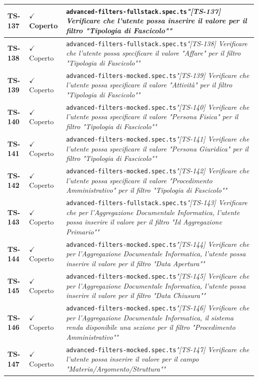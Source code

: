 \documentclass[a4paper,12pt]{article}
\newcommand{\ok}{\textcolor{green!60!black}{$\checkmark$ Coperto}}
\newcommand{\f}[1]{\nolinkurl{#1}\newline}
\newcommand{\q}[1]{\textit{#1}}
\begin{document}
\begin{longtable}{|p{1.5cm}|p{3.0cm}|p{10.5cm}|}
\textbf{TS-137} & \ok & \f{advanced-filters-fullstack.spec.ts}\q{"[TS-137] Verificare che l'utente possa inserire il valore per il filtro "Tipologia di Fascicolo""} \\ \hline
\textbf{TS-138} & \ok & \f{advanced-filters-fullstack.spec.ts}\q{"[TS-138] Verificare che l'utente possa specificare il valore "Affare" per il filtro "Tipologia di Fascicolo""} \\ \hline
\textbf{TS-139} & \ok & \f{advanced-filters-mocked.spec.ts}\q{"[TS-139] Verificare che l'utente possa specificare il valore "Attività" per il filtro "Tipologia di Fascicolo""} \\ \hline
\textbf{TS-140} & \ok & \f{advanced-filters-mocked.spec.ts}\q{"[TS-140] Verificare che l'utente possa specificare il valore "Persona Fisica" per il filtro "Tipologia di Fascicolo""} \\ \hline
\textbf{TS-141} & \ok & \f{advanced-filters-mocked.spec.ts}\q{"[TS-141] Verificare che l'utente possa specificare il valore "Persona Giuridica" per il filtro "Tipologia di Fascicolo""} \\ \hline
\textbf{TS-142} & \ok & \f{advanced-filters-mocked.spec.ts}\q{"[TS-142] Verificare che l'utente possa specificare il valore "Procedimento Amministrativo" per il filtro "Tipologia di Fascicolo""} \\ \hline
\textbf{TS-143} & \ok & \f{advanced-filters-fullstack.spec.ts}\q{"[TS-143] Verificare che per l'Aggregazione Documentale Informatica, l'utente possa inserire il valore per il filtro "Id Aggregazione Primario""} \\ \hline
\textbf{TS-144} & \ok & \f{advanced-filters-mocked.spec.ts}\q{"[TS-144] Verificare che per l'Aggregazione Documentale Informatica, l'utente possa inserire il valore per il filtro "Data Apertura""} \\ \hline
\textbf{TS-145} & \ok & \f{advanced-filters-mocked.spec.ts}\q{"[TS-145] Verificare che per l'Aggregazione Documentale Informatica, l'utente possa inserire il valore per il filtro "Data Chiusura""} \\ \hline
\textbf{TS-146} & \ok & \f{advanced-filters-mocked.spec.ts}\q{"[TS-146] Verificare che per l'Aggregazione Documentale Informatica, il sistema renda disponibile una sezione per il filtro "Procedimento Amministrativo""} \\ \hline
\textbf{TS-147} & \ok & \f{advanced-filters-mocked.spec.ts}\q{"[TS-147] Verificare che l'utente possa inserire il valore per il campo "Materia/Argomento/Struttura""} \\ \hline

\end{longtable}
\end{document}
